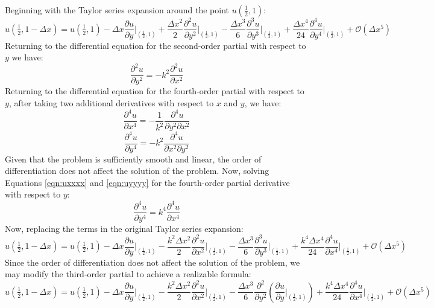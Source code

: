 \documentclass[10pt]{article}		%
\numberwithin{equation}{section}
\newcommand{\pder}[2]{\frac{\partial#1}{\partial#2}}			%
\newcommand{\psder}[2]{\dfrac{\partial^2#1}{\partial#2^2}}		%
\newcommand{\ptder}[2]{\dfrac{\partial^3#1}{\partial#2^3}}		%
\newcommand{\pfder}[2]{\dfrac{\partial^4#1}{\partial#2^4}}		%
\begin{document}
Beginning with the Taylor series expansion around the point $u(\tfrac{1}{2}, 1)$:
\begin{equation}
u(\tfrac{1}{2}, 1-\Delta x) = u(\tfrac{1}{2}, 1) - \Delta x \pder{u}{y}\Big|_{\left(\tfrac{1}{2}, 1\right)} + \frac{\Delta x^2}{2} \psder{u}{y}\Big|_{\left(\tfrac{1}{2}, 1\right)} - \frac{\Delta x^3}{6} \ptder{u}{y}\Big|_{\left(\tfrac{1}{2}, 1\right)} + \frac{\Delta x^4}{24} \pfder{u}{y}\Big|_{\left(\tfrac{1}{2}, 1\right)} + \mathcal{O}(\Delta x^5)
\end{equation}
Returning to the differential equation for the second-order partial with respect to $y$ we have:
\begin{equation}
\psder{u}{y} = -k^2\psder{u}{x}
\end{equation}
Returning to the differential equation for the fourth-order partial with respect to $y$, after taking two additional derivatives with respect to $x$ and $y$, we have:
\begin{equation}
\label{eqn:uxxxx}
\pfder{u}{x}= -\frac{1}{k^2}\frac{\partial^4 u}{\partial y^2 \partial x^2} 
\end{equation}
\begin{equation}
\label{eqn:uyyyy}
\pfder{u}{y} = -k^2\frac{\partial^4 u}{\partial x^2 \partial y^2}
\end{equation}
Given that the problem is sufficiently smooth and linear, the order of differentiation does not affect the solution of the problem. Now, solving Equations \ref{eqn:uxxxx} and \ref{eqn:uyyyy} for the fourth-order partial derivative with respect to $y$:
\begin{equation}
\pfder{u}{y} = k^4\pfder{u}{x}
\end{equation}
Now, replacing the terms in the original Taylor series expansion:
\begin{equation}
u(\tfrac{1}{2}, 1-\Delta x) = u(\tfrac{1}{2}, 1) - \Delta x \pder{u}{y}\Big|_{\left(\tfrac{1}{2}, 1\right)} - \frac{k^2 \Delta x^2}{2} \psder{u}{x}\Big|_{\left(\tfrac{1}{2}, 1\right)} - \frac{\Delta x^3}{6} \ptder{u}{y}\Big|_{\left(\tfrac{1}{2}, 1\right)} + \frac{k^4 \Delta x^4}{24} \pfder{u}{x}\Big|_{\left(\tfrac{1}{2}, 1\right)} + \mathcal{O}(\Delta x^5)
\end{equation}
Since the order of differentiation does not affect the solution of the problem, we may modify the third-order partial to achieve a realizable formula:
\begin{equation}
u(\tfrac{1}{2}, 1-\Delta x) = u(\tfrac{1}{2}, 1) - \Delta x \pder{u}{y}\Big|_{\left(\tfrac{1}{2}, 1\right)} - \frac{k^2 \Delta x^2}{2} \psder{u}{x}\Big|_{\left(\tfrac{1}{2}, 1\right)} - \frac{\Delta x^3}{6} \psder{}{y}\left(\pder{u}{y}\Big|_{\left(\tfrac{1}{2}, 1\right)}\right) + \frac{k^4 \Delta x^4}{24} \pfder{u}{x}\Big|_{\left(\tfrac{1}{2}, 1\right)} + \mathcal{O}(\Delta x^5)
\end{equation}
\end{document}
